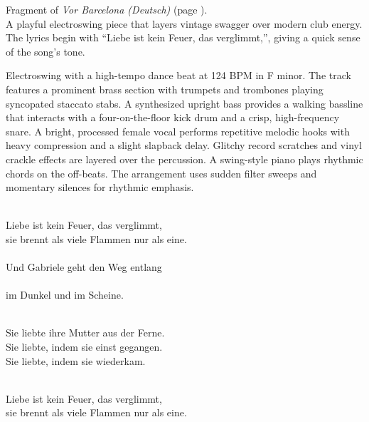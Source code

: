

\begin{notes}
Fragment of \emph{Vor Barcelona (Deutsch)} (page \pageref{sec:vor-barcelona-deutsch}).\\
A playful electroswing piece that layers vintage swagger over modern club energy. %
The lyrics begin with “Liebe ist kein Feuer, das verglimmt,”, giving a quick sense of the song’s tone.
\end{notes}

\begin{style}
Electroswing with a high-tempo dance beat at 124 BPM in F minor. %
The track features a prominent brass section with trumpets and trombones playing syncopated staccato stabs. %
A synthesized upright bass provides a walking bassline that interacts with a four-on-the-floor kick drum and a crisp, high-frequency snare. %
A bright, processed female vocal performs repetitive melodic hooks with heavy compression and a slight slapback delay. %
Glitchy record scratches and vinyl crackle effects are layered over the percussion. %
A swing-style piano plays rhythmic chords on the off-beats. %
The arrangement uses sudden filter sweeps and momentary silences for rhythmic emphasis.
\end{style}

\begin{lyrics}

\\
Liebe ist kein Feuer, das verglimmt,\\
sie brennt als viele Flammen nur als eine.\\
\\
Und Gabriele geht den Weg entlang\\
\\
im Dunkel und im Scheine.

\\
Sie liebte ihre Mutter aus der Ferne.\\
Sie liebte, indem sie einst gegangen.\\
Sie liebte, indem sie wiederkam.

\\
Liebe ist kein Feuer, das verglimmt,\\
sie brennt als viele Flammen nur als eine.

\end{lyrics}

